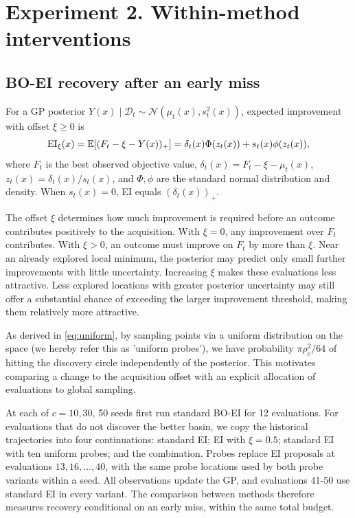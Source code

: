 \section{Experiment 2. Within-method interventions}\label{sec:exp2}


\subsection{BO-EI recovery after an early miss}
\label{sec:bo_recovery}
For a GP posterior \(Y(x)\mid\mathcal D_t\sim\mathcal N(\mu_t(x),s_t^2(x))\), expected improvement with offset \(\xi\geq0\) is
\begin{equation}
\label{eq:ei}
 \operatorname{EI}_\xi(x)
 =\mathbb E[(F_t-\xi-Y(x))_+]
 =\delta_t(x)\Phi(z_t(x))+s_t(x)\phi(z_t(x)),
\end{equation}
where \(F_t\) is the best observed objective value,
\(\delta_t(x)=F_t-\xi-\mu_t(x)\),
\(z_t(x)=\delta_t(x)/s_t(x)\), and \(\Phi,\phi\) are the standard normal distribution and density. When \(s_t(x)=0\), EI equals \((\delta_t(x))_+\).

The offset \(\xi\) determines how much improvement is required before an outcome contributes positively to the acquisition. With \(\xi=0\), any improvement over \(F_t\) contributes. With \(\xi>0\), an outcome must improve on \(F_t\) by more than \(\xi\). Near an already explored local minimum, the posterior may predict only small further improvements with little uncertainty. Increasing \(\xi\) makes these evaluations less attractive. Less explored locations with greater posterior uncertainty may still offer a substantial chance of exceeding the larger improvement threshold, making them relatively more attractive.

As derived in \eqref{eq:uniform}, by sampling points via a uniform distribution on the space (we hereby refer this as 'uniform probes'), we have probability \(\pi\rho_c^2/64\) of hitting the discovery circle independently of the posterior. This motivates comparing a change to the acquisition offset with an explicit allocation of evaluations to global sampling.

At each of \(c=10,30\), 50 seeds first run standard BO-EI for 12 evaluations. For evaluations that do not discover the better basin, we copy the historical trajectories into four continuations: standard EI; EI with \(\xi=0.5\); standard EI with ten uniform probes; and the combination. Probes replace EI proposals at evaluations \(13,16,\ldots,40\), with the same probe locations used by both probe variants within a seed. All observations update the GP, and evaluations 41-50 use standard EI in every variant. The comparison between methods therefore measures recovery conditional on an early miss, within the same total budget.


